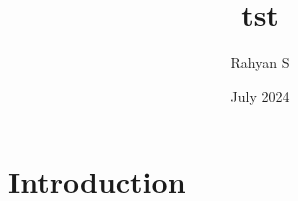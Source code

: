 \documentclass{article}
\title{tst}
\author{Rahyan S}
\date{July 2024}
\begin{document}
\maketitle

\section{Introduction}
\end{document}
